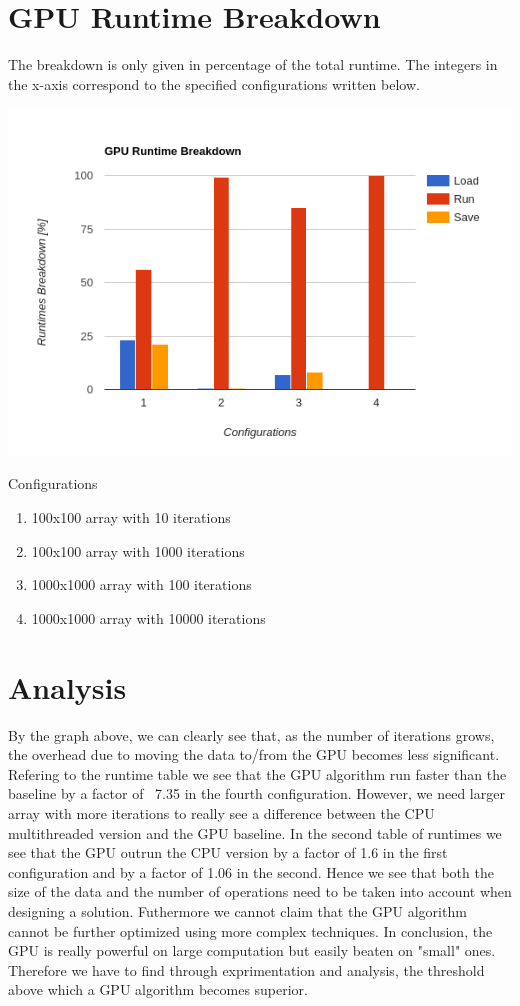 \documentclass{article}
\begin{document}
\section{GPU Runtime Breakdown}
The breakdown is only given in percentage of the total runtime. The integers in the x-axis correspond to the specified configurations written below.
\begin{center}
\includegraphics[scale=0.6]{graph.png}
\end{center}
Configurations
\begin{enumerate}
\item 100x100 array with 10 iterations
\item 100x100 array with 1000 iterations
\item 1000x1000 array with 100 iterations
\item 1000x1000 array with 10000 iterations
\end{enumerate}
\section{Analysis}
By the graph above, we can clearly see that, as the number of iterations grows, the overhead due to moving the data to/from the GPU becomes less significant. Refering to the runtime table we see that the GPU algorithm run faster than the baseline by a factor of ~7.35 in the fourth configuration. However, we need larger array with more iterations to really see a difference between the CPU multithreaded version and the GPU baseline. In the second table of runtimes we see that the GPU outrun the CPU version by a factor of 1.6 in the first configuration and by a factor of 1.06 in the second. Hence we see that both the size of the data and the number of operations need to be taken into account when designing a solution. Futhermore we cannot claim that the GPU algorithm cannot be further optimized using more complex techniques. In conclusion, the GPU is really powerful on large computation but easily beaten on "small" ones. Therefore we have to find through exprimentation and analysis, the threshold above which a GPU algorithm becomes superior.
\end{document}
